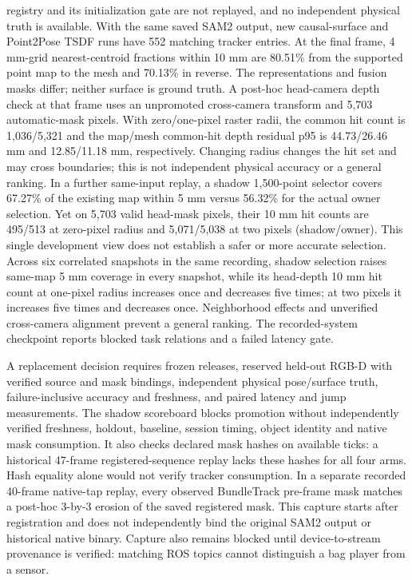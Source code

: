 \documentclass[10pt,journal]{IEEEtran}
\begin{document}
registry and its initialization gate are not replayed, and no independent physical truth is available. With the same saved SAM2 output, new causal-surface and Point2Pose TSDF runs have 552 matching tracker entries. At the final frame, 4 mm-grid nearest-centroid fractions within 10 mm are 80.51\% from the supported point map to the mesh and 70.13\% in reverse. The representations and fusion masks differ; neither surface is ground truth. A post-hoc head-camera depth check at that frame uses an unpromoted cross-camera transform and 5,703 automatic-mask pixels. With zero/one-pixel raster radii, the common hit count is 1,036/5,321 and the map/mesh common-hit depth residual p95 is 44.73/26.46 mm and 12.85/11.18 mm, respectively. Changing radius changes the hit set and may cross boundaries; this is not independent physical accuracy or a general ranking. In a further same-input replay, a shadow 1,500-point selector covers 67.27\% of the existing map within 5 mm versus 56.32\% for the actual owner selection. Yet on 5,703 valid head-mask pixels, their 10 mm hit counts are 495/513 at zero-pixel radius and 5,071/5,038 at two pixels (shadow/owner). This single development view does not establish a safer or more accurate selection. Across six correlated snapshots in the same recording, shadow selection raises same-map 5 mm coverage in every snapshot, while its head-depth 10 mm hit count at one-pixel radius increases once and decreases five times; at two pixels it increases five times and decreases once. Neighborhood effects and unverified cross-camera alignment prevent a general ranking. The recorded-system checkpoint reports blocked task relations and a failed latency gate.

A replacement decision requires frozen releases, reserved held-out RGB-D with verified source and mask bindings, independent physical pose/surface truth, failure-inclusive accuracy and freshness, and paired latency and jump measurements. The shadow scoreboard blocks promotion without independently verified freshness, holdout, baseline, session timing, object identity and native mask consumption. It also checks declared mask hashes on available ticks: a historical 47-frame registered-sequence replay lacks these hashes for all four arms. Hash equality alone would not verify tracker consumption. In a separate recorded 40-frame native-tap replay, every observed BundleTrack pre-frame mask matches a post-hoc 3-by-3 erosion of the saved registered mask. This capture starts after registration and does not independently bind the original SAM2 output or historical native binary. Capture also remains blocked until device-to-stream provenance is verified: matching ROS topics cannot distinguish a bag player from a sensor.
\end{document}
